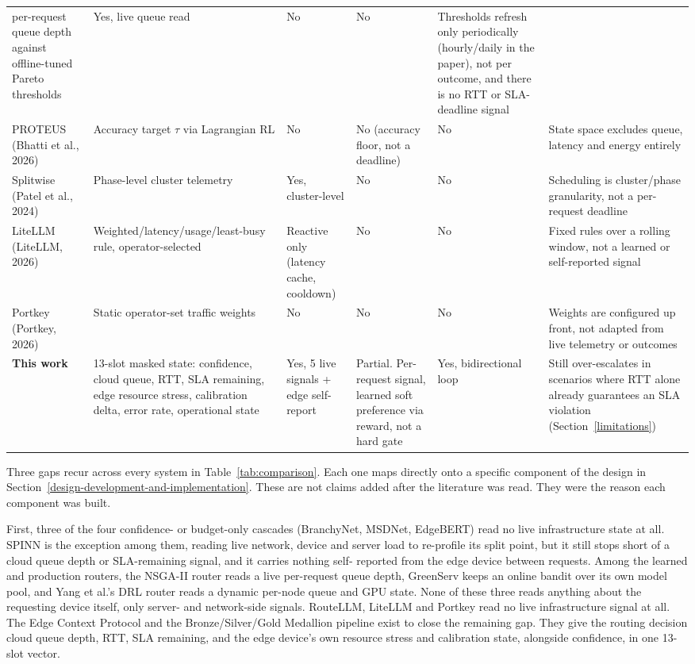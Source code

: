 {\begin{longtable}{p{2.3cm}p{2.9cm}p{1.5cm}p{1.5cm}p{1.3cm}p{3.2cm}}
per-request queue depth against offline-tuned Pareto thresholds & Yes,
live queue read & No & No & Thresholds refresh only periodically
(hourly/daily in the paper), not per outcome, and there is no RTT or
SLA-deadline signal \\ PROTEUS
(Bhatti et al., 2026) & Accuracy target $\tau$ via Lagrangian RL & No &
No (accuracy floor, not a deadline) & No & State space excludes queue,
latency and energy entirely \\ Splitwise (Patel et al., 2024) &
Phase-level cluster telemetry & Yes, cluster-level & No & No &
Scheduling is cluster/phase granularity, not a per-request deadline \\
LiteLLM (LiteLLM, 2026) & Weighted/\-latency/\-usage/\-least-busy rule,
operator-selected & Reactive only (latency cache, cooldown) & No & No &
Fixed rules over a rolling window, not a learned or self-reported signal
\\ Portkey (Portkey, 2026) & Static operator-set traffic weights & No &
No & No & Weights are configured up front, not adapted from live
telemetry or outcomes \\ \textbf{This work} & 13-slot masked state:
confidence, cloud queue, RTT, SLA remaining, edge resource stress,
calibration delta, error rate, operational state & Yes, 5 live signals +
edge self-report & Partial. Per-request signal, learned soft preference
via reward, not a hard gate & Yes, bidirectional loop & Still
over-escalates in scenarios where RTT alone already guarantees an SLA
violation (Section~\ref{limitations}) \\ \bottomrule \end{longtable} }

Three gaps recur across every system in Table~\ref{tab:comparison}.
Each one maps directly onto a specific component of the design in
Section~\ref{design-development-and-implementation}. These are not claims added after the literature was read.
They were the reason each component was built.

First, three of the four confidence- or budget-only cascades
(BranchyNet, MSDNet, EdgeBERT) read no live infrastructure state at
all. SPINN is the exception among them, reading live network, device and server load
to re-profile its split point, but it still stops short of a cloud
queue depth or SLA-remaining signal, and it carries nothing self-
reported from the edge device between requests. Among the learned and
production routers, the NSGA-II router reads a live per-request queue
depth, GreenServ keeps an online bandit over its own model pool, and
Yang et al.'s DRL router reads a dynamic per-node queue and GPU state.
None of these three reads anything about the requesting device itself,
only server- and network-side signals. RouteLLM, LiteLLM and Portkey
read no live infrastructure signal at all. The Edge Context Protocol
and the Bronze/Silver/Gold Medallion pipeline exist to close the
remaining gap. They give the routing decision cloud queue depth, RTT,
SLA remaining, and the edge device's own resource stress and
calibration state, alongside confidence, in one 13-slot vector.

